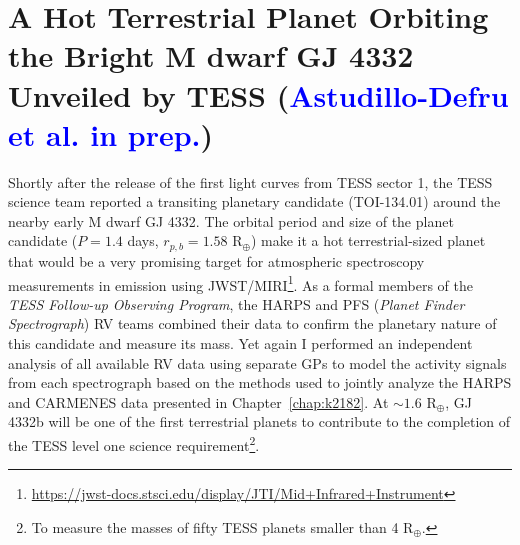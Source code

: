 \section{A Hot Terrestrial Planet Orbiting the Bright M dwarf GJ 4332 Unveiled
  by TESS (\textcolor{blue}{Astudillo-Defru et al. in prep.})}
Shortly after the release of the first light curves from TESS sector 1, the
TESS science team reported a transiting planetary candidate (TOI-134.01)
around the nearby early M dwarf GJ 4332.
The orbital period and size of the planet candidate
($P=1.4$ days, $r_{p,b}=1.58$ R$_{\oplus}$) make it a hot
terrestrial-sized planet that would be a very promising target for atmospheric
spectroscopy measurements in emission using JWST/MIRI\footnote{\url{https://jwst-docs.stsci.edu/display/JTI/Mid+Infrared+Instrument}}. As a formal members of
the \emph{TESS Follow-up Observing Program}, the HARPS and PFS
(\emph{Planet Finder Spectrograph}) RV teams combined their data to confirm the
planetary nature of this candidate and measure its mass. Yet again I
performed an independent analysis of all available RV data using separate GPs
to model the activity signals from each spectrograph based on the methods used
to jointly analyze the HARPS and CARMENES data presented in
Chapter~\ref{chap:k2182}. At $\sim 1.6$ R$_{\oplus}$, GJ 4332b will be one
of the first terrestrial planets to contribute to the completion of the TESS
level one science requirement\footnote{To measure the masses of fifty TESS planets
  smaller than 4 R$_{\oplus}$.}.
